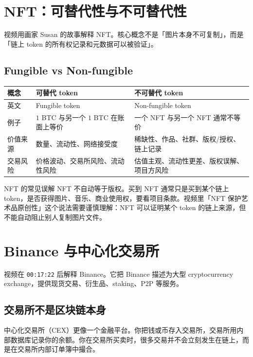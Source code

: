 \documentclass[UTF8,11pt]{ctexart}
\newcommand{\timestamp}[1]{\textcolor{blue!50!black}{\texttt{#1}}}
\begin{document}
\section{NFT：可替代性与不可替代性}

视频用画家 Susan 的故事解释 NFT。核心概念不是「图片本身不可复制」，而是「链上 token 的所有权记录和元数据可以被验证」。

\subsection{Fungible vs Non-fungible}

\begin{longtable}{>{\raggedright\arraybackslash}p{4cm}>{\raggedright\arraybackslash}p{5.2cm}>{\raggedright\arraybackslash}p{5.2cm}}
\toprule
\textbf{概念} & \textbf{可替代 token} & \textbf{不可替代 token} \\
\midrule
\endhead
英文 & Fungible token & Non-fungible token \\
例子 & \(1\) BTC 与另一个 \(1\) BTC 在账面上等价 & 一个 NFT 与另一个 NFT 通常不等价 \\
价值来源 & 数量、流动性、网络接受度 & 稀缺性、作品、社群、版权/授权、链上记录 \\
交易风险 & 价格波动、交易所风险、流动性风险 & 估值主观、流动性更差、版权误解、项目方风险 \\
\bottomrule
\end{longtable}

\begin{warnbox}{NFT 的常见误解}
NFT 不自动等于版权。买到 NFT 通常只是买到某个链上 token，是否获得图片、音乐、商业使用权，要看项目条款。视频里「NFT 保护艺术品原创性」这个说法需要谨慎理解：NFT 可以证明某个 token 的链上来源，但不能自动阻止别人复制图片文件。
\end{warnbox}

\section{Binance 与中心化交易所}

视频在 \timestamp{00:17:22} 后解释 Binance。它把 Binance 描述为大型 cryptocurrency exchange，提供现货交易、衍生品、staking、P2P 等服务。

\subsection{交易所不是区块链本身}

中心化交易所（CEX）更像一个金融平台。你把钱或币存入交易所，交易所用内部数据库记录你的余额。你在交易所买卖时，很多交易并不会立刻发生在链上，而是在交易所内部订单簿中撮合。
\end{document}
